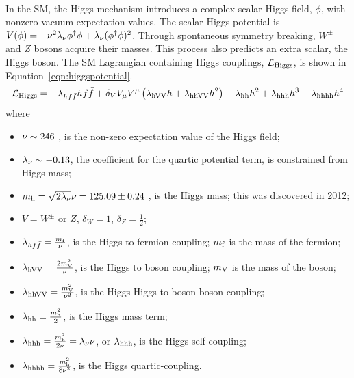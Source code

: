 \paragraph{}
In the SM, the Higgs mechanism introduces a complex scalar Higgs field, $\phi$, with nonzero vacuum expectation values. The scalar Higgs potential is $V(\phi) = -\nu^2\lambda_{\rm \nu} \phi^{\dagger}\phi + \lambda_{\rm \nu}(\phi^\dagger\phi)^2$. Through spontaneous symmetry breaking, $W^{\pm}$ and $Z$ bosons acquire their masses.  This process also predicts an extra scalar, the Higgs boson. The SM Lagrangian containing Higgs couplings, $\mathcal{L}_{\rm Higgs}$, is shown in Equation~\ref{eqn:higgspotential}.
\begin{equation}
\label{eqn:higgspotential}
\mathcal{L}_{\rm Higgs} = -\lambda_{hf\bar{f}} hf\bar{f} + \delta_{V} V_{\rm\mu} V^{\rm\mu}\left(\lambda_{\rm hVV} h + \lambda_{\rm hhVV}h^2\right) + \lambda_{\rm hh}h^2 + \lambda_{\rm hhh}h^3 + \lambda_{\rm hhhh}h^4 
\end{equation}
where 
\begin{itemize}
	\item $\rm\nu \sim 246$ \GeV, is the non-zero expectation value of the Higgs field;\
	\item $\lambda_{\rm \nu} \sim -0.13$, the coefficient for the quartic potential term, is constrained from Higgs mass;
  \item $m_{\rm h} = \sqrt{2\lambda_{\rm \nu}}\nu = 125.09 \pm 0.24$ \GeV, is the Higgs mass; this was discovered in 2012\cite{ATLASHiggsDisc, CMSHiggsDisc}; 
	\item $V = W^{\pm}$ or $Z$, $\delta_{W} = 1$, $\delta_{Z} = \frac{1}{2}$;
	\item $\lambda_{hf\bar{f}} = \frac{m_{\rm f}}{\rm\nu}$, is the Higgs to fermion coupling; $m_{\rm f}$ is the mass of the fermion;
	\item $\lambda_{\rm hVV} = \frac{2m_{\rm V}^2}{\rm\nu}$, is the Higgs to boson coupling; $m_{\rm V}$ is the mass of the boson;
	\item $\lambda_{\rm hhVV} = \frac{m_{\rm V}^2}{\rm\nu^2}$, is the Higgs-Higgs to boson-boson coupling;
	\item $\lambda_{\rm hh} = \frac{m_{\rm h}^2}{2}$, is the Higgs mass term;
	\item $\lambda_{\rm hhh} = \frac{m_{\rm h}^2}{2\rm\nu} = \lambda_{\rm \nu} \nu$, or $\lambda_{\rm hhh}$, is the Higgs self-coupling;
	\item $\lambda_{\rm hhhh} = \frac{m_{\rm h}^2}{8\rm\nu^2}$, is the Higgs quartic-coupling.
\end{itemize}
